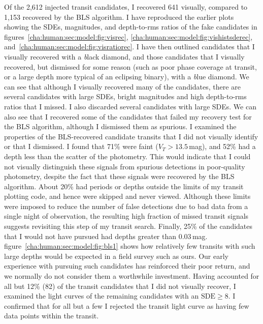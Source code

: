 Of the 2,612 injected transit candidates, I recovered 641 visually, compared to 1,153 recovered by the BLS algorithm.
I have reproduced the earlier plots showing the SDEs, magnitudes, and depth-to-rms ratios of the fake candidates in figures~\ref{cha:human:sec:model:fig:visrec}, \ref{cha:human:sec:model:fig:vishistsderec}, and~\ref{cha:human:sec:model:fig:visratiorec}. I have then outlined candidates that I visually recovered with a {\textit black diamond}, and those candidates that I visually recovered, but dismissed for some reason (such as poor phase coverage at transit, or a large depth more typical of an eclipsing binary), with a {\textit blue diamond.}
We can see that although I visually recovered many of the candidates, there are several candidates with large SDEs, bright magnitudes and high depth-to-rms ratios that I missed.
I also discarded several candidates with large SDEs.
We can also see that I recovered some of the candidates that failed my recovery test for the BLS algorithm, although I dismissed them as spurious.
I examined the properties of the BLS-recovered candidate transits that I did not visually identify or that I dismissed.
I found that 71\% were faint ($V_{T}>13.5$\,mag), and 52\% had a depth less than the scatter of the photometry.
This would indicate that I could not visually distinguish these signals from spurious detections in poor-quality photometry, despite the fact that these signals were recovered by the BLS algorithm.
About 20\% had periods or depths outside the limits of my transit plotting code, and hence were skipped and never viewed.
Although these limits were imposed to reduce the number of false detections due to bad data from a single night of observation, the resulting high fraction of missed transit signals suggests revisiting this step of my transit search.
Finally, 25\% of the candidates that I would not have pursued had depths greater than 0.03\,mag.
figure~\ref{cha:human:sec:model:fig:bls1} %
shows how relatively few transits with such large depths would be expected in a field survey such as ours.
Our early experience with pursuing such candidates has reinforced their poor return, and we normally do not consider them a worthwhile investment.
Having accounted for all but 12\% (82) of the transit candidates that I did not visually recover, I examined the light curves of the remaining candidates with an $\mathrm{SDE}\geq8$.
I confirmed that for all but a few I rejected the transit light curve as having few data points within the transit.


